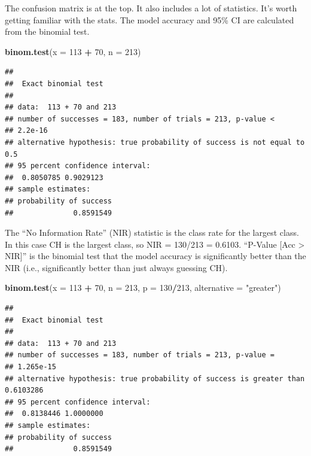 \documentclass[]{book}
\newenvironment{Shaded}{\begin{snugshade}}{\end{snugshade}}
\newcommand{\DataTypeTok}[1]{\textcolor[rgb]{0.13,0.29,0.53}{#1}}
\newcommand{\DecValTok}[1]{\textcolor[rgb]{0.00,0.00,0.81}{#1}}
\newcommand{\KeywordTok}[1]{\textcolor[rgb]{0.13,0.29,0.53}{\textbf{#1}}}
\newcommand{\NormalTok}[1]{#1}
\newcommand{\OperatorTok}[1]{\textcolor[rgb]{0.81,0.36,0.00}{\textbf{#1}}}
\newcommand{\StringTok}[1]{\textcolor[rgb]{0.31,0.60,0.02}{#1}}
\begin{document}
The confusion matrix is at the top. It also includes a lot of statistics. It's worth getting familiar with the stats. The model accuracy and 95\% CI are calculated from the binomial test.

\begin{Shaded}
\begin{Highlighting}[]
\KeywordTok{binom.test}\NormalTok{(}\DataTypeTok{x =} \DecValTok{113} \OperatorTok{+}\StringTok{ }\DecValTok{70}\NormalTok{, }\DataTypeTok{n =} \DecValTok{213}\NormalTok{)}
\end{Highlighting}
\end{Shaded}

\begin{verbatim}
## 
##  Exact binomial test
## 
## data:  113 + 70 and 213
## number of successes = 183, number of trials = 213, p-value <
## 2.2e-16
## alternative hypothesis: true probability of success is not equal to 0.5
## 95 percent confidence interval:
##  0.8050785 0.9029123
## sample estimates:
## probability of success 
##              0.8591549
\end{verbatim}

The ``No Information Rate'' (NIR) statistic is the class rate for the largest class. In this case CH is the largest class, so NIR = 130/213 = 0.6103. ``P-Value {[}Acc \textgreater{} NIR{]}'' is the binomial test that the model accuracy is significantly better than the NIR (i.e., significantly better than just always guessing CH).

\begin{Shaded}
\begin{Highlighting}[]
\KeywordTok{binom.test}\NormalTok{(}\DataTypeTok{x =} \DecValTok{113} \OperatorTok{+}\StringTok{ }\DecValTok{70}\NormalTok{, }\DataTypeTok{n =} \DecValTok{213}\NormalTok{, }\DataTypeTok{p =} \DecValTok{130}\OperatorTok{/}\DecValTok{213}\NormalTok{, }\DataTypeTok{alternative =} \StringTok{"greater"}\NormalTok{)}
\end{Highlighting}
\end{Shaded}

\begin{verbatim}
## 
##  Exact binomial test
## 
## data:  113 + 70 and 213
## number of successes = 183, number of trials = 213, p-value =
## 1.265e-15
## alternative hypothesis: true probability of success is greater than 0.6103286
## 95 percent confidence interval:
##  0.8138446 1.0000000
## sample estimates:
## probability of success 
##              0.8591549
\end{verbatim}
\end{document}

